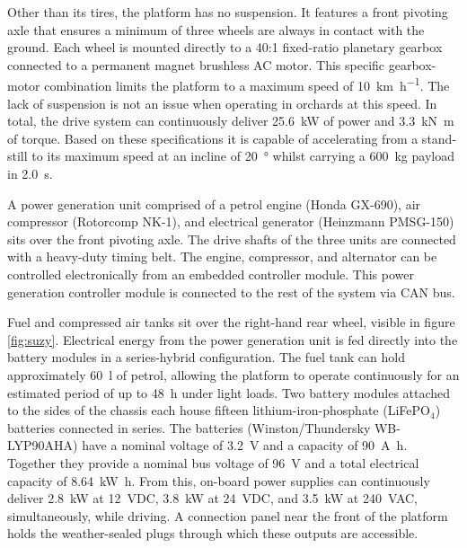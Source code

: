 \documentclass[preprint,authoryear,12pt]{elsarticle}
\begin{document}
        Other than its tires, the platform has no suspension.
        It features a front pivoting axle that ensures a minimum of three wheels are always in contact with the ground.
        Each wheel is mounted directly to a 40:1 fixed-ratio planetary gearbox connected to a permanent magnet brushless AC motor.
        This specific gearbox-motor combination limits the platform to a maximum speed of \SI{10}{\kilo\meter\per\hour}.
        The lack of suspension is not an issue when operating in orchards at this speed.
        In total, the drive system can continuously deliver \SI{25.6}{\kilo\watt} of power and \SI{3.3}{\kilo\newton\meter} of torque.
        Based on these specifications it is capable of accelerating from a stand-still to its maximum speed at an incline of \SI{20}{\degree} whilst carrying a \SI{600}{\kilo\gram} payload in \SI{2.0}{\second}.

        A power generation unit comprised of a petrol engine (Honda GX-690), air compressor (Rotorcomp NK-1), and electrical generator (Heinzmann PMSG-150) sits over the front pivoting axle.
        The drive shafts of the three units are connected with a heavy-duty timing belt.
        The engine, compressor, and alternator can be controlled electronically from an embedded controller module.
        This power generation controller module is connected to the rest of the system via CAN bus.

        Fuel and compressed air tanks sit over the right-hand rear wheel, visible in figure \ref{fig:suzy}.
        Electrical energy from the power generation unit is fed directly into the battery modules in a series-hybrid configuration.
        The fuel tank can hold approximately \SI{60}{\litre} of petrol, allowing the platform to operate continuously for an estimated period of up to \SI{48}{\hour} under light loads.
        Two battery modules attached to the sides of the chassis each house fifteen lithium-iron-phosphate (LiFePO$_{\text{4}}$) batteries connected in series.
        The batteries (Winston/Thundersky WB-LYP90AHA) have a nominal voltage of \SI{3.2}{\volt} and a capacity of \SI{90}{\ampere\hour}.
        Together they provide a nominal bus voltage of \SI{96}{\volt} and a total electrical capacity of \SI{8.64}{\kilo\watt\hour}.
        From this, on-board power supplies can continuously deliver \SI{2.8}{\kilo\watt} at \SI{12}{\volt}DC, \SI{3.8}{\kilo\watt} at \SI{24}{\volt}DC, and \SI{3.5}{\kilo\watt} at \SI{240}{\volt}AC, simultaneously, while driving.
        A connection panel near the front of the platform holds the weather-sealed plugs through which these outputs are accessible.
\end{document}
